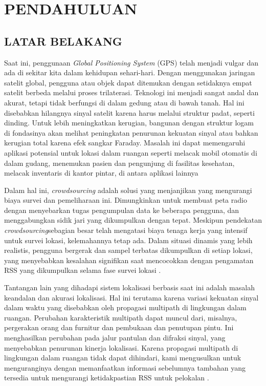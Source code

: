 \fancyhf{}
\fancyfoot[C]{\thepage}


\chapter{PENDAHULUAN}

\section{\uppercase{LATAR BELAKANG}}


\par Saat ini, penggunaan \textit{Global Positioning System} (GPS) telah menjadi vulgar dan ada di sekitar kita dalam kehidupan sehari-hari. Dengan menggunakan jaringan satelit global, pengguna atau objek dapat ditemukan dengan setidaknya empat satelit berbeda melalui proses trilaterasi. Teknologi ini menjadi sangat andal dan akurat, tetapi tidak berfungsi di dalam gedung atau di bawah tanah. Hal ini disebabkan hilangnya sinyal satelit karena harus melalui struktur padat, seperti dinding. Untuk lebih meningkatkan kerugian, bangunan dengan struktur logam di fondasinya akan melihat peningkatan penurunan kekuatan sinyal atau bahkan kerugian total karena efek sangkar Faraday. Masalah ini dapat memengaruhi aplikasi potensial untuk lokasi dalam ruangan seperti melacak mobil otomatis di dalam gudang, menemukan pasien dan pengunjung di fasilitas kesehatan, melacak inventaris di kantor pintar, di antara aplikasi lainnya \citep{Santos2021}

\par Dalam hal ini, \textit{crowdsourcing} adalah solusi yang menjanjikan yang mengurangi biaya survei dan pemeliharaan ini. Dimungkinkan untuk membuat peta radio dengan menyebarkan tugas pengumpulan data ke beberapa pengguna, dan menggabungkan sidik jari yang dikumpulkan dengan tepat. Meskipun pendekatan \textit{crowdsourcing}sebagian besar telah mengatasi biaya tenaga kerja yang intensif untuk survei lokasi, kelemahannya tetap ada.  Dalam situasi dinamis yang lebih realistis, pengguna bergerak dan sampel terbatas dikumpulkan di setiap lokasi, yang menyebabkan kesalahan signifikan saat mencocokkan dengan pengamatan RSS yang dikumpulkan selama fase survei lokasi \citep{Sun2019}.

\par Tantangan lain yang dihadapi sistem lokalisasi berbasis \textit{ } saat ini adalah masalah keandalan dan akurasi lokalisasi. Hal ini terutama karena variasi kekuatan sinyal dalam waktu yang disebabkan oleh propagasi multipath di lingkungan dalam ruangan. Perubahan karakteristik multipath dapat muncul dari, misalnya, pergerakan orang dan furnitur dan pembukaan dan penutupan pintu. Ini menghasilkan perubahan pada jalur pantulan dan difraksi sinyal, yang menyebabkan penurunan kinerja lokalisasi. Karena propagasi multipath di lingkungan dalam ruangan tidak dapat dihindari, kami mengusulkan untuk menguranginya dengan memanfaatkan informasi sebelumnya tambahan yang tersedia untuk mengurangi ketidakpastian RSS untuk pelokalan \citep{Sun2019}.

